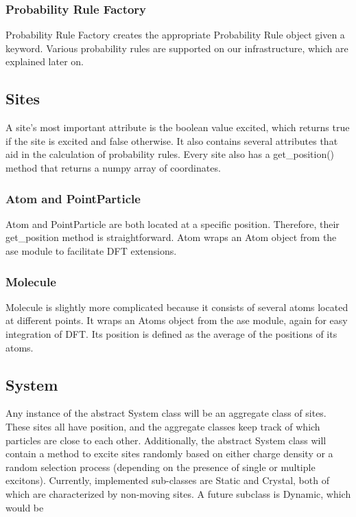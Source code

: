 \documentclass{article}
\begin{document}
\subsubsection{Probability Rule Factory}

Probability Rule Factory creates the appropriate Probability Rule object given a keyword. Various probability rules are supported on our infrastructure, which are explained later on.




\subsection{Sites}

A site's most important attribute is the boolean value excited, which returns true if the site is excited and false otherwise. It also contains several attributes that aid in the calculation of probability rules. Every site also has a get\_position() method that returns a numpy array of coordinates.

\subsubsection{Atom and PointParticle}

Atom and PointParticle are both located at a specific position. Therefore, their get\_position method is straightforward. Atom wraps an Atom object from the ase module to facilitate DFT extensions.



\subsubsection{Molecule}

Molecule is slightly more complicated because it consists of several atoms located at different points. It wraps an Atoms object from the ase module, again for easy integration of DFT. Its position is defined as the average of the positions of its atoms.

\subsection{System}

Any instance of the abstract System class will be an aggregate class of sites. These sites all have position, and the aggregate classes keep track of which particles are close to each other. Additionally, the abstract System class will contain a method to excite sites randomly based on either charge density or a random selection process (depending on the presence of single or multiple excitons). Currently, implemented sub-classes are Static and Crystal, both of which are characterized by non-moving sites. A future subclass is Dynamic, which would be 
\end{document}
